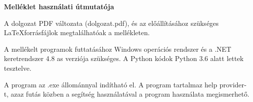 \pagestyle{empty}

\noindent \textbf{\Large Melléklet használati útmutatója}

\vskip 1cm

A dolgozat PDF változata (dolgozat.pdf), és az előállításához szükséges \LaTeX  forrásfájlok megtalálhatóak a mellékleten. 

A mellékelt programok futtatásához Windows operációs rendszer és a .NET keretrendszer 4.8 as verziója szükséges. A Python kódok Python 3.6 alatt lettek tesztelve. 

A program az .exe állománnyal indítható el. A program tartalmaz help provider-t, azaz futás közben a segítség használatával a program használata megismerhető. 